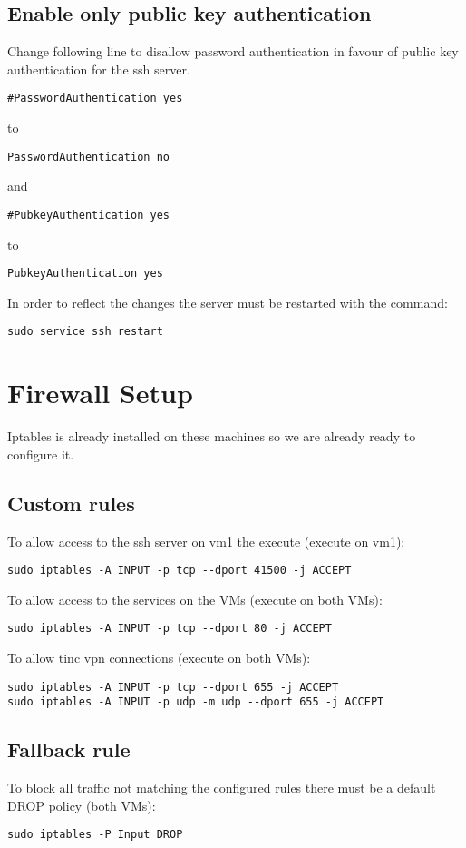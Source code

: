 \documentclass[10pt,a4paper]{article}
\begin{document}
\subsection{Enable only public key authentication}
Change following line to disallow password authentication in favour of public key authentication for the ssh server.

\begin{verbatim}
#PasswordAuthentication yes
\end{verbatim}
to
\begin{verbatim}
PasswordAuthentication no
\end{verbatim}
and
\begin{verbatim}
#PubkeyAuthentication yes
\end{verbatim}
to
\begin{verbatim}
PubkeyAuthentication yes
\end{verbatim}

In order to reflect the changes the server must be restarted with the command:
\begin{verbatim}
sudo service ssh restart
\end{verbatim}

\newpage
\section{Firewall Setup}
Iptables is already installed on these machines so we are already ready to configure it.

\subsection{Custom rules}
To allow access to the ssh server on vm1 the execute (execute on vm1):
\begin{verbatim}
sudo iptables -A INPUT -p tcp --dport 41500 -j ACCEPT
\end{verbatim}

To allow access to the services on the VMs (execute on both VMs):
\begin{verbatim}
sudo iptables -A INPUT -p tcp --dport 80 -j ACCEPT
\end{verbatim}

To allow tinc vpn connections (execute on both VMs):
\begin{verbatim}
sudo iptables -A INPUT -p tcp --dport 655 -j ACCEPT
sudo iptables -A INPUT -p udp -m udp --dport 655 -j ACCEPT
\end{verbatim}

\subsection{Fallback rule}
To block all traffic not matching the configured rules there must be a default DROP policy (both VMs):
\begin{verbatim}
sudo iptables -P Input DROP
\end{verbatim}
\end{document}
